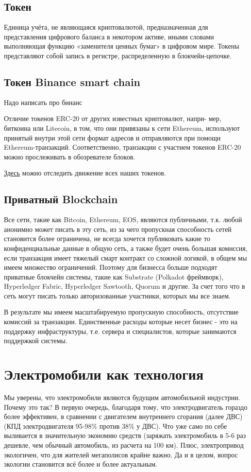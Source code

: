 \documentclass[a4paper,12pt]{report}
\newcommand{\contractAddress}{0x37d29cb7d543300063a50d85389d409c01da7945}
\begin{document}
\section{Токен}
Единица учёта, не являющаяся криптовалютой, предназначенная для представления цифрового баланса в некотором активе, иными словами выполняющая функцию «заменителя ценных бумаг» в цифровом мире. Токены представляют собой запись в регистре, распределенную в блокчейн-цепочке.

\section{Токен Binance smart chain}
Надо написать про бинанс

Отличие токенов ERC-20 от других известных криптовалют, напри-
мер, биткоина или Litecoin, в том, что они привязаны к сети Ethereum, используют принятый внутри этой сети формат адресов и отправляются при помощи Ethereum-транзакций. Соответственно, транзакции с участием токенов ERC-20 можно прослеживать в обозревателе блоков.


\href{https://etherscan.io/address/\contractAddress}{Здесь} можно отследить движение всех наших токенов.

\section{Приватный Blockchain}
Все сети, такие как Bitcoin, Ethereum, EOS, являются публичными, т.к. любой анонимно может писать в эту сеть, из за чего пропускная способность сетей становится более ограничена, не всегда хочется публиковать какие то конфиденциальные данные в общую сеть, а также будет очень большая комиссия, если транзакция имеет тяжелый смарт контракт со сложной логикой, в общем мы имеем множество ограничений. Поэтому для бизнесса больше подходят приватные блокчейн системы, такие как Substrate (Polkadot фреймворк), Hyperledger Fabric, Hyperledger Sawtooth, Quorum и другие. За счет того что в сеть могут писать только авторизованные участники, которых мы все знаем. 

В результате мы имеем масштабируемую пропускную способность, отсутствие комиссий за транзакции. Единственные расходы которые несет бизнес - это на поддержку инфраструктуры, т.е. сервера и специалистов, которые занимаются поддержкой системы.



\chapter{Электромобили как технология}
\label{chapter3}
Мы уверены, что электромобили являются будущим автомобильной индустрии. Почему это так? 
В первую очередь, благодаря тому, что электродвигатель гораздо более эффективен, в сравнении с двигателем внутреннего сгорания (далее ДВС) (КПД электродвигателя 95-98\% против 38\% у ДВС). Что уже само по себе выливается в значительную экономию средств (заряжать электромобиль в 5-6 раз дешевле, чем обычный автомобиль, из расчета на 100 км). Плюс, электропривод экологичен, что для жителей мегаполисов крайне важно. Да и в целом, вопрос экологии становится всё более и более актуальным. 
\end{document}
